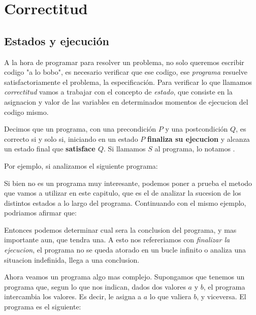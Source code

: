 \documentclass{article}
\begin{document}
\newpage
\section{Correctitud}

\subsection{Estados y ejecución}

A la hora de programar para resolver un problema, no solo queremos escribir codigo "a lo bobo", es necesario verificar que ese codigo, ese \textit{programa} resuelve satisfactoriamente el problema, la especificación. Para verificar lo que llamamos \textit{correctitud} vamos a trabajar con el concepto de \textit{estado}, que consiste en la asignacion y valor de las variables en determinados momentos de ejecucion del codigo mismo.

Decimos que un programa, con una precondición $P$ y una postcondición $Q$, es correcto si y solo si, iniciando en un estado $P$ \textbf{finaliza su ejecucion} y alcanza un estado final que \textbf{satisface $Q$}. Si llamamos $S$ al programa, lo notamos .

Por ejemplo, si analizamos el siguiente programa:


Si bien no es un programa muy interesante, podemos poner a prueba el metodo que vamos a utilizar en este capitulo, que es el de analizar la sucesion de los distintos estados a lo largo del programa. Continuando con el mismo ejemplo, podriamos afirmar que:


Entonces podemos determinar cual sera la conclusion del programa, y mas importante aun, que tendra una. A esto nos refereriamos con \textit{finalizar la ejecucion}, el programa no se queda atorado en un bucle infinito o analiza una situacion indefinida, llega a una conclusion.

Ahora veamos un programa algo mas complejo. Supongamos que tenemos un programa que, segun lo que nos indican, dados dos valores $a$ y $b$, el programa intercambia los valores. Es decir, le asigna a $a$ lo que valiera $b$, y viceversa. El programa es el siguiente:
\end{document}
